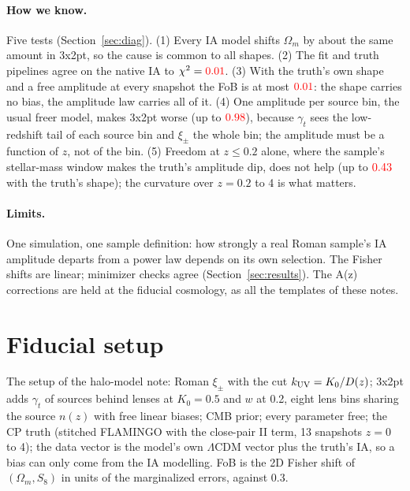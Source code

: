 \documentclass[11pt]{article}
\newcommand{\Om}{\Omega_m}
\newif\ifnumbersfinal
\newcommand{\refresh}[1]{\ifnumbersfinal#1\else\textcolor{red}{#1}\fi}
\begin{document}
\paragraph{How we know.} Five tests (Section~\ref{sec:diag}). (1) Every IA
model shifts $\Om$ by about the same amount in 3x2pt, so the cause is
common to all shapes. (2) The fit and truth pipelines agree on the native
IA to $\chi^2=\refresh{\checkChiTx}$. (3) With the truth's own shape and a
free amplitude at every snapshot the FoB is at most
$\refresh{\fobTxOracleMax}$: the shape carries no bias, the amplitude law
carries all of it. (4) One amplitude per source bin, the usual freer
model, makes 3x2pt worse (up to $\refresh{\fobTxNlazMax}$), because
$\gamma_t$ sees the low-redshift tail of each source bin and $\xi_\pm$ the
whole bin; the amplitude must be a function of $z$, not of the bin. (5)
Freedom at $z\le0.2$ alone, where the sample's stellar-mass window makes
the truth's amplitude dip, does not help (up to
$\refresh{\fobTxCtrlLzMax}$ with the truth's shape); the curvature over
$z=0.2$ to 4 is what matters.

\paragraph{Limits.} One simulation, one sample definition: how strongly a
real Roman sample's IA amplitude departs from a power law depends on its
own selection. The Fisher shifts are linear; minimizer checks agree
(Section~\ref{sec:results}). The A(z) corrections are held at the
fiducial cosmology, as all the templates of these notes.

\section{Fiducial setup}

The setup of the halo-model note: Roman $\xi_\pm$ with the cut
$k_{\rm UV}=K_0/D(z)$; 3x2pt adds $\gamma_t$ of sources behind lenses at
$K_0=0.5$ and $w$ at 0.2, eight lens bins sharing the source $n(z)$ with
free linear biases; CMB prior; every parameter free; the CP truth
(stitched FLAMINGO with the close-pair II term, 13 snapshots $z=0$ to 4);
the data vector is the model's own $\Lambda$CDM vector plus the truth's
IA, so a bias can only come from the IA modelling. FoB is the 2D Fisher
shift of $(\Om, S_8)$ in units of the marginalized errors, against 0.3.
\end{document}
